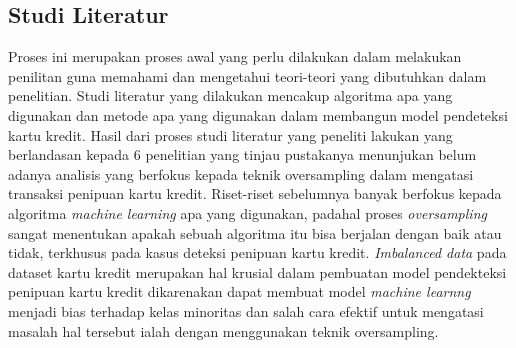 \subsection{Studi Literatur} \label{III.StudiLiteratur}
Proses ini merupakan proses awal yang perlu dilakukan dalam melakukan penilitan guna memahami dan mengetahui teori-teori yang dibutuhkan dalam penelitian. Studi literatur yang dilakukan mencakup algoritma apa yang digunakan dan metode apa yang digunakan dalam membangun model pendeteksi kartu kredit. Hasil dari proses studi literatur yang peneliti lakukan yang berlandasan kepada 6 penelitian yang tinjau pustakanya menunjukan belum adanya analisis yang berfokus kepada teknik oversampling dalam mengatasi transaksi penipuan kartu kredit. Riset-riset sebelumnya banyak berfokus kepada algoritma \textit{machine learning} apa yang digunakan, padahal proses \textit{oversampling} sangat menentukan apakah sebuah algoritma itu bisa berjalan dengan baik atau tidak\cite{ningsih2022analisis}, terkhusus pada kasus deteksi penipuan kartu kredit. \textit{Imbalanced data} pada dataset kartu kredit merupakan hal krusial dalam pembuatan model pendekteksi penipuan kartu kredit dikarenakan dapat membuat model \textit{machine learnng} menjadi bias terhadap kelas minoritas dan salah cara efektif untuk mengatasi masalah hal tersebut ialah dengan menggunakan teknik oversampling\cite{liu2004effect}.
